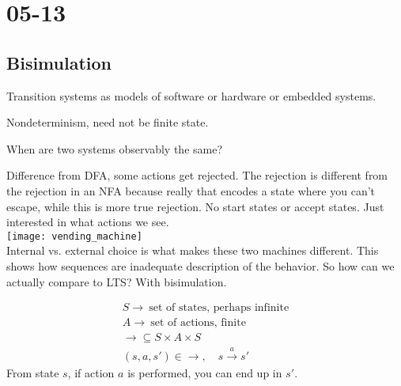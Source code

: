 \documentclass[../598comp.tex]{subfiles}
\date{05-13}
\begin{document}
\section{05-13}

\subsection{Bisimulation}

Transition systems as models of software or hardware or embedded systems.

Nondeterminism, need not be finite state.

When are two systems observably the same?


\begin{example}
  Difference from DFA, some actions get rejected. The rejection is different
  from the rejection in an NFA because really that encodes a state where you
  can't escape, while this is more true rejection. No start states or accept
  states. Just interested in what actions we see.
  \\
  \texttt{[image: vending\_machine]}
  \\
  Internal vs. external choice is what makes these two machines different. This
  shows how sequences are inadequate description of the behavior. So how can we
  actually compare to LTS? With bisimulation.
\end{example}

\begin{definition}
  \begin{gather*}
    S \to \ \text{set of states, perhaps infinite} \\
    A \to \ \text{set of actions, finite} \\
    \to \subseteq S \times A \times S \\
    (s, a, s') \in \to, \quad s \overset{a}{\to} s'
  \end{gather*}
  From state $s$, if action $a$ is performed, you can end up in $s'$.
\end{definition}
\end{document}
